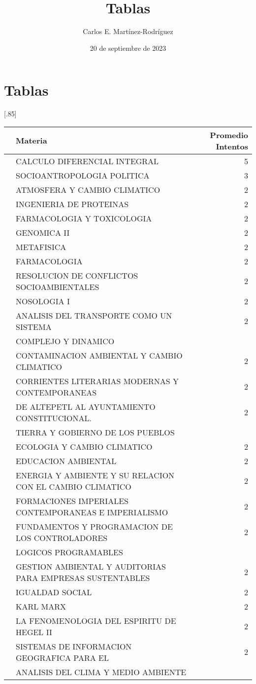 \documentclass[12pt]{article}
\title{Tablas}
\author{Carlos E. Martínez-Rodríguez}
\date{20 de septiembre de 2023}
\begin{document}
\maketitle

\section{Tablas}

\begin{table}[ht]
\centering
\scalebox{0.75}[.85]{
\begin{tabular}{rlr}
  \hline
 & Materia & Promedio Intentos \\ 
  \hline
 & CALCULO DIFERENCIAL INTEGRAL & 5 \\ 
 & SOCIOANTROPOLOGIA POLITICA & 3 \\ 
 & ATMOSFERA Y CAMBIO CLIMATICO & 2 \\ 
 & INGENIERIA DE PROTEINAS & 2 \\ 
 & FARMACOLOGIA Y TOXICOLOGIA & 2 \\ 
 & GENOMICA II & 2 \\ 
 & METAFISICA & 2 \\ 
 & FARMACOLOGIA & 2 \\ 
 & RESOLUCION DE CONFLICTOS SOCIOAMBIENTALES & 2 \\ 
 & NOSOLOGIA I & 2 \\ 
 & ANALISIS DEL TRANSPORTE COMO UN SISTEMA & 2 \\ 
 & COMPLEJO Y DINAMICO &  \\ 
 & CONTAMINACION AMBIENTAL Y CAMBIO CLIMATICO & 2 \\ 
 & CORRIENTES LITERARIAS MODERNAS Y CONTEMPORANEAS & 2 \\ 
 & DE ALTEPETL AL AYUNTAMIENTO CONSTITUCIONAL. & 2 \\ 
 & TIERRA Y GOBIERNO DE LOS PUEBLOS &  \\ 
 & ECOLOGIA Y CAMBIO CLIMATICO & 2 \\ 
 & EDUCACION AMBIENTAL & 2 \\ 
 & ENERGIA Y AMBIENTE Y SU RELACION CON EL CAMBIO CLIMATICO & 2 \\ 
 & FORMACIONES IMPERIALES CONTEMPORANEAS E IMPERIALISMO & 2 \\ 
 & FUNDAMENTOS Y PROGRAMACION DE LOS CONTROLADORES & 2 \\ 
 & LOGICOS PROGRAMABLES &  \\ 
 & GESTION AMBIENTAL Y AUDITORIAS PARA EMPRESAS SUSTENTABLES & 2 \\ 
 & IGUALDAD SOCIAL & 2 \\ 
 & KARL MARX & 2 \\ 
 & LA FENOMENOLOGIA DEL ESPIRITU DE HEGEL II & 2 \\ 
 & SISTEMAS DE INFORMACION GEOGRAFICA PARA EL & 2 \\ 
 & ANALISIS DEL CLIMA Y MEDIO AMBIENTE &  \\ 
   \hline
\end{tabular}}
\end{table}
\end{document}
